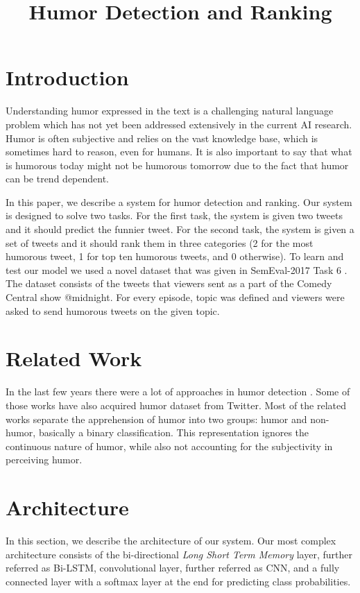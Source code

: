 \documentclass[10pt, a4paper]{article}
\title{Humor Detection and Ranking}
\begin{document}
\maketitleabstract

\section{Introduction}

Understanding humor expressed in the text is a challenging natural language 
problem which has not yet been addressed extensively in the current AI research.
Humor is often subjective and relies on the vast knowledge base, which is sometimes
hard to reason, even for humans. It is also important to say that what is
humorous today might not be humorous tomorrow due to the fact that humor can be
trend dependent.

In this paper, we describe a system for humor detection and
ranking. Our system is designed to solve two tasks. For the first task, the
system is given two tweets and it should predict the funnier tweet.
For the second task, the system is given a set of tweets and it should rank them
in three categories (2 for the most humorous tweet, 1 for top ten humorous
tweets, and 0 otherwise). To learn and test our model we used a novel dataset that was
given in SemEval-2017 Task 6 \citep{potash2016hashtagwars}. The dataset consists of
the tweets that viewers sent as a part of the Comedy Central show @midnight. For every
episode, topic was defined and viewers were asked to send humorous
tweets on the given topic.

\section{Related Work}

In the last few years there were a lot of approaches in humor detection \citep{mihalcea2005,reyes2013,zhang2014,barbieri2014,yang2015}.
Some of those works \citep{reyes2013,zhang2014,barbieri2014} have also acquired
humor dataset from Twitter. Most of the related works separate the apprehension 
of humor into two groups: humor and non-humor, basically a binary classification.
This representation ignores the continuous nature of humor, while also not accounting
for the subjectivity in perceiving humor\citep{potash2016hashtagwars}.

\section{Architecture}

In this section, we describe the architecture of our system. Our most complex
architecture consists of the bi-directional
\emph{Long Short Term Memory}\cite{LSTM} layer, further referred as Bi-LSTM,
convolutional layer\citep{cnn}, further referred as CNN, and a fully connected
layer with a softmax layer at the end for predicting class probabilities.
\end{document}
